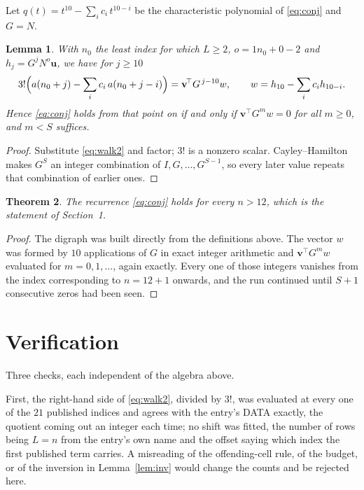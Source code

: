 \documentclass[11pt,a4paper]{article}
\theoremstyle{plain}
\newtheorem{theorem}{Theorem}
\newtheorem{lemma}[theorem]{Lemma}
\theoremstyle{definition}
\begin{document}
Let $q(t)=t^{10}-\sum_i c_i\,t^{10-i}$ be the characteristic polynomial of
\eqref{eq:conj} and $G=N$.

\begin{lemma}\label{lem:crit}
With $n_0$ the least index for which $L\ge2$, $o=1n_0+0-2$ and
$h_j=G^{j}N^{o}\mathbf{u}$, we have for $j\ge10$
\[
3!\Bigl(a(n_0+j)-\sum_i c_i\,a(n_0+j-i)\Bigr)=\mathbf{v}^{\!\top}G^{\,j-10}w,
\qquad w=h_{10}-\sum_i c_i h_{10-i} .
\]
Hence \eqref{eq:conj} holds from that point on if and only if
$\mathbf{v}^{\!\top}G^{m}w=0$ for all $m\ge0$, and $m<S$ suffices.
\end{lemma}

\begin{proof}
Substitute \eqref{eq:walk2} and factor; $3!$ is a nonzero scalar. Cayley--Hamilton
makes $G^{S}$ an integer combination of $I,G,\dots,G^{S-1}$, so every later value repeats
that combination of earlier ones.
\end{proof}

\begin{theorem}
The recurrence \eqref{eq:conj} holds for every $n>12$, which is the statement of
Section~1.
\end{theorem}

\begin{proof}
The digraph was built directly from the definitions above. The vector $w$ was formed by
$10$ applications of $G$ in exact integer arithmetic and $\mathbf{v}^{\!\top}G^{m}w$
evaluated for $m=0,1,\dots$, again exactly. Every one of those integers vanishes from the
index corresponding to $n=12+1$ onwards, and the run continued until $S+1$ consecutive
zeros had been seen.
\end{proof}

\section{Verification}

Three checks, each independent of the algebra above.

First, the right-hand side of \eqref{eq:walk2}, divided by $3!$, was evaluated at every
one of the $21$ published indices and agrees with the entry's DATA exactly, the quotient
coming out an integer each time; no shift was fitted, the number of rows being
$L=n$ from the entry's own name and the offset saying which index the first published
term carries. A misreading of the offending-cell rule, of the budget, or of the inversion in
Lemma~\ref{lem:inv} would change the counts and be rejected here.
\end{document}
